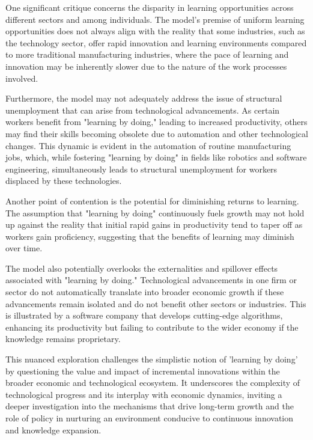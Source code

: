 \documentclass[12pt]{report}
\begin{document}
One significant critique concerns the disparity in learning opportunities across different sectors and among
individuals. The model's premise of uniform learning opportunities does not always align with the reality that some
industries, such as the technology sector, offer rapid innovation and learning environments compared to more traditional
manufacturing industries, where the pace of learning and innovation may be inherently slower due to the nature of the
work processes involved.

Furthermore, the model may not adequately address the issue of structural unemployment that can arise from technological
advancements. As certain workers benefit from "learning by doing," leading to increased productivity, others may find
their skills becoming obsolete due to automation and other technological changes. This dynamic is evident in the
automation of routine manufacturing jobs, which, while fostering "learning by doing" in fields like robotics and
software engineering, simultaneously leads to structural unemployment for workers displaced by these technologies.

Another point of contention is the potential for diminishing returns to learning. The assumption that "learning by
doing" continuously fuels growth may not hold up against the reality that initial rapid gains in productivity tend to
taper off as workers gain proficiency, suggesting that the benefits of learning may diminish over time.

The model also potentially overlooks the externalities and spillover effects associated with "learning by doing."
Technological advancements in one firm or sector do not automatically translate into broader economic growth if these
advancements remain isolated and do not benefit other sectors or industries. This is illustrated by a software company
that develops cutting-edge algorithms, enhancing its productivity but failing to contribute to the wider economy if the
knowledge remains proprietary.


This nuanced exploration challenges the simplistic notion of 'learning by doing' by questioning the value and impact of
incremental innovations within the broader economic and technological ecosystem. It underscores the complexity of
technological progress and its interplay with economic dynamics, inviting a deeper investigation into the mechanisms
that drive long-term growth and the role of policy in nurturing an environment conducive to continuous innovation and
knowledge expansion. 
\end{document}
